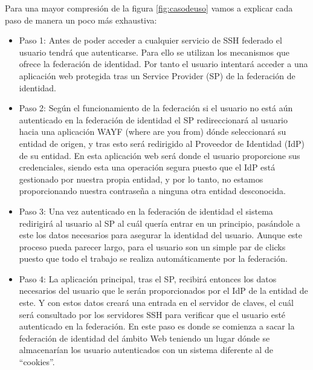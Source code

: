     Para una mayor compresión de la figura \ref{fig:casodeuso} vamos a
    explicar cada paso de manera un poco más exhaustiva:

    \begin{itemize}
        
        \item{Paso 1:} Antes de poder acceder a cualquier servicio de
        SSH federado el usuario tendrá que autenticarse. Para ello se
        utilizan los mecanismos que ofrece la federación de identidad.
        Por tanto el usuario intentará acceder a una aplicación web
        protegida tras un Service Provider (SP) de la federación de
        identidad.

        \item{Paso 2:} Según el funcionamiento de la federación si el
        usuario no está aún autenticado en la federación de identidad
        el SP redireccionará al usuario hacia una aplicación WAYF
        (where are you from) dónde seleccionará su entidad de origen,
        y tras esto será redirigido al Proveedor de Identidad (IdP) de
        su entidad. En esta aplicación web será donde el usuario
        proporcione sus credenciales, siendo esta una operación
        segura puesto que el IdP está gestionado por nuestra propia
        entidad, y por lo tanto, no estamos proporcionando nuestra
        contraseña a ninguna otra entidad desconocida.

        \item{Paso 3:} Una vez autenticado en la federación de
        identidad el sistema redirigirá al usuario al SP al cuál
        quería entrar en un principio, pasándole a este los datos
        necesarios para asegurar la identidad del usuario.
        Aunque este proceso pueda parecer largo, para el usuario son
        un simple par de clicks puesto que todo el trabajo se realiza
        automáticamente por la federación.

        \item{Paso 4:} La aplicación principal, tras el SP, recibirá
        entonces los datos necesarios del usuario que le serán
        proporcionados por el IdP de la entidad de este. Y con estos
        datos creará una entrada en el servidor de claves, el cuál
        será consultado por los servidores SSH para verificar que el
        usuario esté autenticado en la federación.
        En este paso es donde se comienza a sacar la federación de
        identidad del ámbito Web teniendo un lugar dónde se
        almacenarían los usuario autenticados con un sistema
        diferente al de ``cookies''.


\end{itemize}
